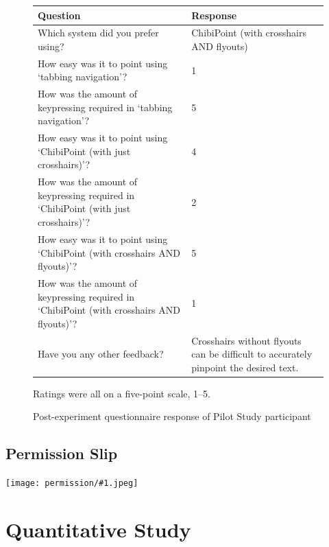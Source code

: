 \documentclass[11pt,openright,a4paper]{report}
\begin{document}
\begin{figure}[ht]
\renewcommand{\arraystretch}{1.5}

\begin{tabularx}{\textwidth}{X|X}
\hline\hline %
Question & Response \\ [0.5ex] %
\hline 
Which system did you prefer using?	&	ChibiPoint (with crosshairs AND flyouts)	\\
How easy was it to point using `tabbing navigation'?	&	1	\\
How was the amount of keypressing required in `tabbing navigation'?	&	5	\\
How easy was it to point using `ChibiPoint (with just crosshairs)'?	&	4	\\
How was the amount of keypressing required in `ChibiPoint (with just crosshairs)'?	&	2	\\
How easy was it to point using `ChibiPoint (with crosshairs AND flyouts)'?	&	5	\\
How was the amount of keypressing required in `ChibiPoint (with crosshairs AND flyouts)'?	&	1	\\
Have you any other feedback?	&	Crosshairs without flyouts can be difficult to accurately pinpoint the desired text.	\\
\hline %
\end{tabularx}
\caption{Post-experiment questionnaire response of Pilot Study participant}
Ratings were all on a five-point scale, 1--5.
\label{fig:partic_pilotpost}
\end{figure}


\section{Permission Slip}
\label{sec:pilot_permission}
\newcommand{\permissionslip}[1]{\centerline{\texttt{[image: permission/\#1.jpeg]}}}
\permissionslip{Zack}


\chapter{Quantitative Study}
\end{document}
